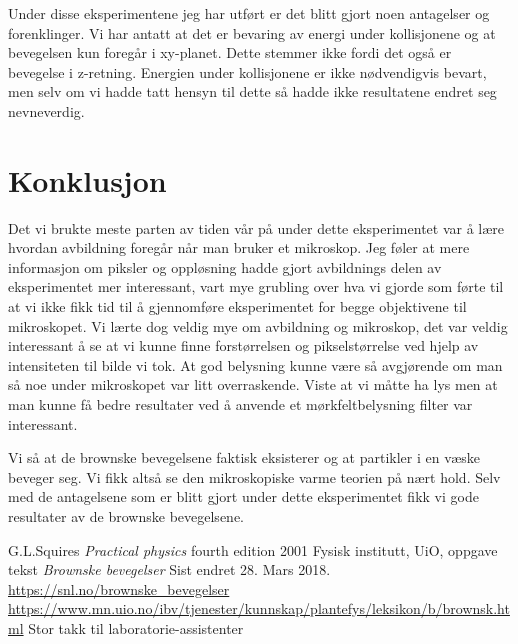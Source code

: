 \documentclass[norsk,a4paper,12pt]{article}
\begin{document}
Under disse eksperimentene jeg har utført er det blitt gjort noen antagelser og forenklinger. Vi har antatt at det er bevaring av energi under kollisjonene og at bevegelsen kun foregår i xy-planet. Dette stemmer ikke fordi det også er bevegelse i z-retning. Energien under kollisjonene er ikke nødvendigvis bevart, men selv om vi hadde tatt hensyn til dette så hadde ikke resultatene endret seg nevneverdig. 



\section{Konklusjon}

Det vi brukte meste parten av tiden vår på under dette eksperimentet var å lære hvordan avbildning foregår når man bruker et mikroskop. Jeg føler at mere informasjon om piksler og oppløsning hadde gjort avbildnings delen av eksperimentet mer interessant, vart mye grubling over hva vi gjorde som førte til at vi ikke fikk tid til å gjennomføre eksperimentet for begge objektivene til mikroskopet. Vi lærte dog veldig mye om avbildning og mikroskop, det var veldig interessant å se at vi kunne finne forstørrelsen og pikselstørrelse ved hjelp av intensiteten til bilde vi tok. At god belysning kunne være så avgjørende om man så noe under mikroskopet var litt overraskende. Viste at vi måtte ha lys men at man kunne få bedre resultater ved å anvende et mørkfeltbelysning filter var interessant. 

Vi så at de brownske bevegelsene faktisk eksisterer og at partikler i en væske beveger seg. Vi fikk altså se den mikroskopiske varme teorien på nært hold. Selv med de antagelsene som er blitt gjort under dette eksperimentet fikk vi gode resultater av de brownske bevegelsene. 

\begin{thebibliography}{}
	G.L.Squires
	\textit{Practical physics}
	fourth edition
	2001
	Fysisk institutt, UiO, oppgave tekst
	\textit{Brownske bevegelser}
	Sist endret 28. Mars 2018.
	\url{https://snl.no/brownske_bevegelser}
	\url{https://www.mn.uio.no/ibv/tjenester/kunnskap/plantefys/leksikon/b/brownsk.html}
	Stor takk til laboratorie-assistenter
\end{thebibliography}
\end{document}
